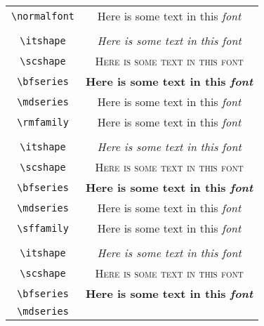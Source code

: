 \begin{table}[t]
    \centering
    \begin{tabular}{c|c}
         \verb!\normalfont! &  
         \normalfont Here is some text in this {\em font} \\ \\
         \verb!\itshape! & 
         \normalfont\itshape Here is some text in this {\em font} \\
         \verb!\scshape! & 
         \normalfont\scshape Here is some text in this font \\
         \verb!\bfseries! & 
         \normalfont\bfseries Here is some text in this {\em font} \\
         \verb!\mdseries! & 
         \normalfont\mdseries Here is some text in this {\em font} \\
         \midrule
          \verb!\rmfamily! &  
         \rmfamily Here is some text in this {\em font} \\ \\
         \verb!\itshape! & 
         \rmfamily\itshape Here is some text in this {\em font} \\
         \verb!\scshape! & 
         \rmfamily\scshape Here is some text in this font \\
         \verb!\bfseries! & 
         \rmfamily\bfseries Here is some text in this {\em font} \\
         \verb!\mdseries! & 
         \rmfamily\mdseries Here is some text in this {\em font} \\
         \midrule
          \verb!\sffamily! &  
         \sffamily Here is some text in this {\em font} \\ \\
         \verb!\itshape! & 
         \sffamily\itshape Here is some text in this {\em font} \\
         \verb!\scshape! & 
         \sffamily\scshape Here is some text in this font \\
         \verb!\bfseries! & 
         \sffamily\bfseries Here is some text in this {\em font} \\
         \verb!\mdseries! & 

\end{tabular}
\end{table}
